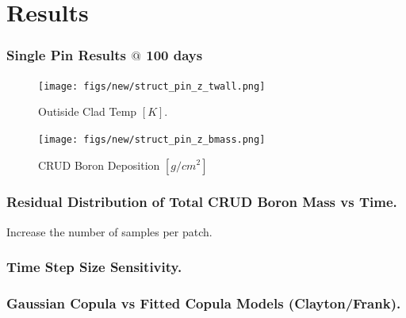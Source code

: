 \documentclass[t, pdftex]{beamer}
\begin{document}
\section{Results}
\begin{frame}
\frametitle{Single Pin Results $@$ 100 days}
    \begin{figure}
        \centering
        \begin{minipage}{.5\textwidth}
            \centering
            \texttt{[image: figs/new/struct\_pin\_z\_twall.png]}
            \caption{Outiside Clad Temp $[K]$.}
        \end{minipage}%
        \begin{minipage}{.5\textwidth}
            \centering
            \texttt{[image: figs/new/struct\_pin\_z\_bmass.png]}
            \caption{ CRUD Boron Deposition $[g/cm^2]$}
        \end{minipage}
    \end{figure}
\end{frame}

\begin{frame}
\frametitle{Residual Distribution of Total CRUD Boron Mass vs Time.}
Increase the number of samples per patch.
\end{frame}

\begin{frame}
\frametitle{Time Step Size Sensitivity.}
\end{frame}

\begin{frame}
\frametitle{Gaussian Copula vs Fitted Copula Models (Clayton/Frank).}
\end{frame}

\end{document}
